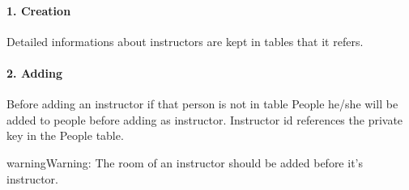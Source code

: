 \documentclass[letterpaper,10pt,english]{sphinxmanual}
\begin{document}
\paragraph{1. Creation}
\label{\detokenize{developer/berkay:creation}}
Detailed informations about instructors are kept in tables that it refers.

\begin{sphinxVerbatim}[commandchars=\\\{\}]
     
       
     
     
     
     
      
     
               
            
            
           
\end{sphinxVerbatim}


\paragraph{2. Adding}
\label{\detokenize{developer/berkay:adding}}
Before adding an instructor if that person is not in table People he/she will be added to people before adding as instructor.
Instructor id references the private key in the People table.

\begin{sphinxadmonition}{warning}{Warning:}
The room of an instructor should be added before it’s instructor.
\end{sphinxadmonition}
\end{document}
